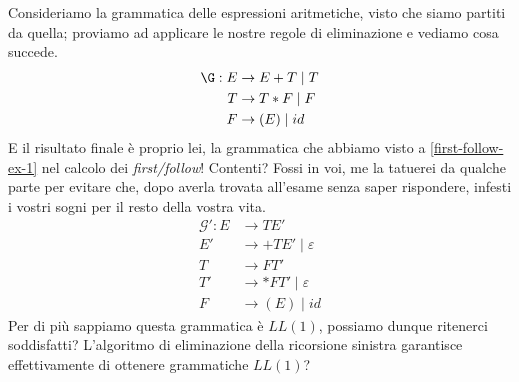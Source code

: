\documentclass[class=book, crop=false, oneside, 12pt]{standalone}
\begin{document}
Consideriamo la grammatica delle espressioni aritmetiche, visto che siamo partiti da quella; proviamo ad applicare le nostre regole di eliminazione e vediamo cosa succede.
\begin{align*}
    \label{non-ll1_grammar}
    \G: E &\to E+T \mid T \\
    T &\to T*F \mid F \nonumber \\
    F &\to (E) \mid id \nonumber 
\end{align*}
E il risultato finale è proprio lei, la grammatica che abbiamo visto a \ref{first-follow-ex-1} nel calcolo dei \emph{first/follow}! Contenti? Fossi in voi, me la tatuerei da qualche parte per evitare che, dopo averla trovata all'esame senza saper rispondere, infesti i vostri sogni per il resto della vostra vita.
\begin{align*}
    \mathcal{G'}: E &\rightarrow TE' \\
    E' &\rightarrow +TE' \mid \varepsilon \\
    T &\rightarrow FT' \\
    T' &\rightarrow *FT' \mid \varepsilon \\
    F &\rightarrow (E) \mid id
\end{align*}
Per di più sappiamo questa grammatica è \(LL(1)\), possiamo dunque ritenerci soddisfatti? L'algoritmo di eliminazione della ricorsione sinistra garantisce effettivamente di ottenere grammatiche \(LL(1)\)?
\end{document}
